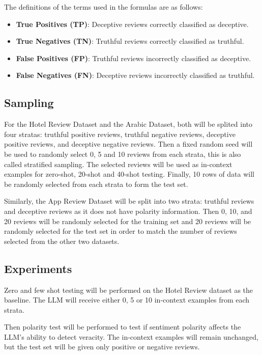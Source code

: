 \documentclass[sigconf, nonacm]{acmart}
\theoremstyle{definition}
\begin{document}
\noindent The definitions of the terms used in the formulas are as follows:
\begin{itemize}
  \item \textbf{True Positives (TP)}: Deceptive reviews correctly classified as deceptive.
  \item \textbf{True Negatives (TN)}: Truthful reviews correctly classified as truthful.
  \item \textbf{False Positives (FP)}: Truthful reviews incorrectly classified as deceptive.
  \item \textbf{False Negatives (FN)}: Deceptive reviews incorrectly classified as truthful.
\end{itemize}

\subsection{Sampling}
For the Hotel Review Dataset and the Arabic Dataset, both will be splited into four stratas: truthful positive reviews, truthful negative reviews, deceptive positive reviews, and deceptive negative reviews. Then a fixed random seed will be used to randomly select 0, 5 and 10 reviews from each strata, this is also called stratified sampling. The selected reviews will be used as in-context examples for zero-shot, 20-shot and 40-shot testing. Finally, 10 rows of data will be randomly selected from each strata to form the test set.

Similarly, the App Review Dataset will be split into two strata: truthful reviews and deceptive reviews as it does not have polarity information. Then 0, 10, and 20 reviews will be randomly selected for the training set and 20 reviews will be randomly selected for the test set in order to match the number of reviews selected from the other two datasets.

\subsection{Experiments}

Zero and few shot testing will be performed on the Hotel Review dataset as the baseline. The LLM will receive either 0, 5 or 10 in-context examples from each strata.

Then polarity test will be performed to test if sentiment polarity affects the LLM's ability to detect veracity. The in-context examples will remain unchanged, but the test set will be given only positive or negative reviews.
\end{document}
